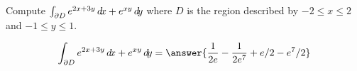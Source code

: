 \documentclass{ximera}
\author{David Guichard \and Neal Koblitz \and H. Jerome Keisler \and Albert Scheller \and Barry Balof \and Mike Wills \and Matthew Carr}
\begin{document}
\begin{exercise}




Compute $\int_{\partial D}e^{2x+3y}\mathop{}\!d\! x+e^{xy}\mathop{}\!d\! y$ where $D$ is the region described by $-2\le x\le 2$ and $-1\le y\le 1$. 
 

\begin{prompt}
\[
\int_{\partial D}e^{2x+3y}\d x+e^{xy}\d y=\answer{\frac{1}{2e}-\frac{1}{2e^7}+e/2-e^{7}/2}
\]
\end{prompt}

\end{exercise}
\end{document}
